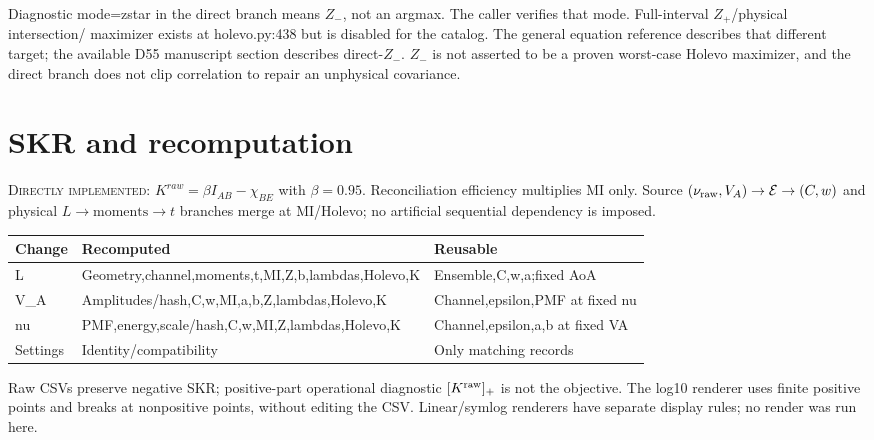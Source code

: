 \documentclass[11pt]{article}
\newcommand{\DI}{\textsc{Directly implemented}}
\begin{document}
Diagnostic mode=zstar in the direct branch means $Z_-$, not an argmax.
The caller verifies that mode. Full-interval $Z_+$/physical intersection/
maximizer exists at holevo.py:438 but is disabled for the catalog.
The general equation reference describes that different target; the available
D55 manuscript section describes direct-$Z_-$. $Z_-$ is not asserted to be a
proven worst-case Holevo maximizer, and the direct branch does not clip
correlation to repair an unphysical covariance.

\section{SKR and recomputation}
\DI: $K^{raw}=\beta I_{AB}-\chi_{BE}$ with $\beta=0.95$.
Reconciliation efficiency multiplies MI only. Source
$(\nu_{\rm raw},V_A)\to\mathcal E\to(C,w)$ and physical $L\to\text{moments}\to t$ branches merge at
MI/Holevo; no artificial sequential dependency is imposed.

\begin{center}\begin{tabular}{p{.1\linewidth}p{.48\linewidth}p{.3\linewidth}}
\toprule Change&Recomputed&Reusable\\\midrule
L&Geometry,channel,moments,t,MI,Z,b,lambdas,Holevo,K&Ensemble,C,w,a;fixed AoA\\
V\_A&Amplitudes/hash,C,w,MI,a,b,Z,lambdas,Holevo,K&Channel,epsilon,PMF at fixed nu\\
nu&PMF,energy,scale/hash,C,w,MI,Z,lambdas,Holevo,K&Channel,epsilon,a,b at fixed VA\\
Settings&Identity/compatibility&Only matching records\\\bottomrule
\end{tabular}\end{center}
Raw CSVs preserve negative SKR; positive-part operational diagnostic
$[K^{\rm raw}]_+$ is not the objective. The log10 renderer uses finite positive points
and breaks at nonpositive points, without editing the CSV.
Linear/symlog renderers have separate display rules; no render was run here.
\end{document}
